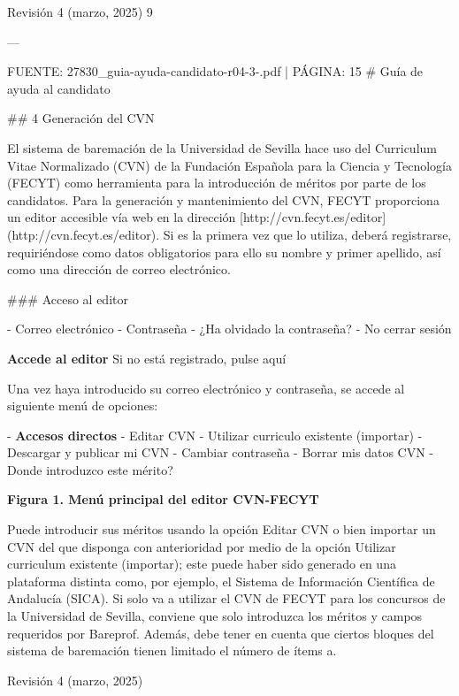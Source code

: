 \documentclass{article}
\begin{document}
\begin{itemize}
\begin{itemize}
\begin{scriptsize}
                  Revisión 4 (marzo, 2025) 9

                  ---

                  FUENTE: 27830\_guia-ayuda-candidato-r04-3-.pdf | PÁGINA: 15
                  \# Guía de ayuda al candidato

                  \#\# 4 Generación del CVN

                  El sistema de baremación de la Universidad de Sevilla hace uso del Curriculum Vitae Normalizado (CVN) de la Fundación Española para la Ciencia y Tecnología (FECYT) como herramienta para la introducción de méritos por parte de los candidatos. Para la generación y mantenimiento del CVN, FECYT proporciona un editor accesible vía web en la dirección [http://cvn.fecyt.es/editor](http://cvn.fecyt.es/editor). Si es la primera vez que lo utiliza, deberá registrarse, requiriéndose como datos obligatorios para ello su nombre y primer apellido, así como una dirección de correo electrónico.

                  \#\#\# Acceso al editor

                  - Correo electrónico
                  - Contraseña
                  - ¿Ha olvidado la contraseña?
                  - No cerrar sesión

                  \textbf{Accede al editor}
                  Si no está registrado, pulse aquí

                  Una vez haya introducido su correo electrónico y contraseña, se accede al siguiente menú de opciones:

                  - \textbf{Accesos directos}
                  - Editar CVN
                  - Utilizar curriculo existente (importar)
                  - Descargar y publicar mi CVN
                  - Cambiar contraseña
                  - Borrar mis datos CVN
                  - Donde introduzco este mérito?

                  \textbf{Figura 1. Menú principal del editor CVN-FECYT}

                  Puede introducir sus méritos usando la opción Editar CVN o bien importar un CVN del que disponga con anterioridad por medio de la opción Utilizar curriculum existente (importar); este puede haber sido generado en una plataforma distinta como, por ejemplo, el Sistema de Información Científica de Andalucía (SICA). Si solo va a utilizar el CVN de FECYT para los concursos de la Universidad de Sevilla, conviene que solo introduzca los méritos y campos requeridos por Bareprof. Además, debe tener en cuenta que ciertos bloques del sistema de baremación tienen limitado el número de ítems a.

                  Revisión 4 (marzo, 2025)
                \end{scriptsize}
        \end{itemize}


\end{itemize}
\end{document}

